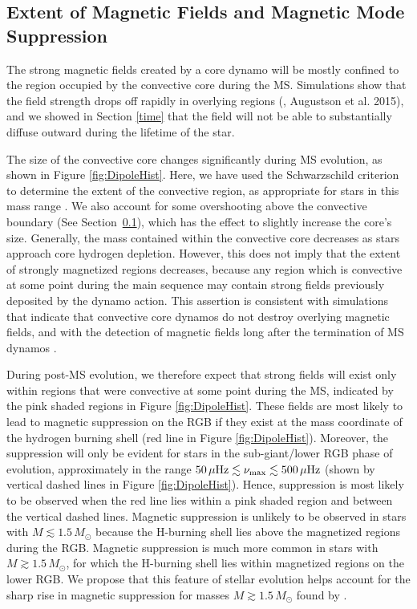 \subsection{Extent of Magnetic Fields and Magnetic Mode Suppression}
\label{rgb}

The strong magnetic fields created by a core dynamo will be mostly confined to the region occupied by the convective core during the MS. Simulations show that the field strength drops off rapidly in overlying regions (\citealt{Featherstone_2009}, Augustson et al. 2015), and we showed in Section \ref{time} that the field will not be able to substantially diffuse outward during the lifetime of the star. 

The size of the convective core changes significantly during MS evolution, as shown in Figure \ref{fig:DipoleHist}. Here, we have used the Schwarzschild criterion to determine the extent of the convective region, as appropriate for stars in this mass range \citep{Moore_2015}. We also account for some overshooting above the convective boundary (See Section~\ref{rgb}), which has the effect to slightly increase the core's size. 
Generally, the mass contained within the convective core decreases as stars approach core hydrogen depletion. However, this does not imply that the extent of strongly magnetized regions decreases, because any region which is convective at some point during the main sequence may contain strong fields previously deposited by the dynamo action. This assertion is consistent with simulations \citep{Featherstone_2009} that indicate that convective core dynamos do not destroy overlying magnetic fields, and with the detection of magnetic fields long after the termination of MS dynamos \citep{Stello_2016}.

During post-MS evolution, we therefore expect that strong fields will exist only within regions that were convective at some point during the MS, indicated by the pink shaded regions in Figure \ref{fig:DipoleHist}. These fields are most likely to lead to magnetic suppression on the RGB if they exist at the mass coordinate of the hydrogen burning shell (red line in Figure \ref{fig:DipoleHist}). Moreover, the suppression will only be evident for stars in the sub-giant/lower RGB phase of evolution, approximately in the range $50 \, \mu {\rm Hz} \lesssim \nu_{\rm max} \lesssim 500 \, \mu {\rm Hz}$ (shown by vertical dashed lines in Figure \ref{fig:DipoleHist}). Hence, suppression is most likely to be observed when the red line lies within a pink shaded region and between the vertical dashed lines. Magnetic suppression is unlikely to be observed in stars with $M \lesssim 1.5 \, M_\odot$ because the H-burning shell lies above the magnetized regions during the RGB. Magnetic suppression is much more common in stars with $M \gtrsim 1.5 \, M_\odot$, for which the H-burning shell lies within magnetized regions on the lower RGB. We propose that this feature of stellar evolution helps account for the sharp rise in magnetic suppression for masses $M \gtrsim 1.5 \, M_\odot$ found by \cite{Stello_2016}.

    
    
  
  